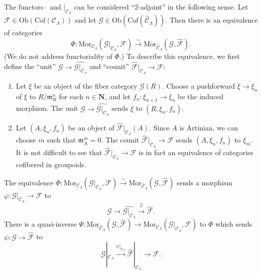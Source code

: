 \begin{remark}
\medskip \noindent
The functors $\widehat{~}$ and $|_{\mathcal{C}_\Lambda}$ can be considered 
``2-adjoint'' in the following sense.  Let $\mathcal{F} \in 
\text{Ob}(\text{Cof}(\mathcal{C}_\Lambda))$ and let $\mathcal G 
\in \text{Ob}(\text{Cof}(\widehat{\mathcal{C}}_\Lambda))$.  Then 
there is an equivalence of categories
\[ 
\Phi: \text{Mor}_{\mathcal{C}_\Lambda}(\mathcal G|_{\mathcal 
C_\Lambda}, \mathcal{F}) 
\xrightarrow{\sim} 
\text{Mor}_{\widehat{\mathcal{C}}_\Lambda}(\mathcal G, \widehat{\mathcal 
F}) .
\]
(We do not address functoriality of $\Phi$.) To describe this equivalence, we 
first define the ``unit'' $\mathcal G \to \widehat{\mathcal 
G|_{\mathcal{C}_\Lambda}}$ and ``counit'' $\widehat{\mathcal{F}}|_{\mathcal 
C_\Lambda} \to \mathcal{F}$:
\begin{enumerate}
\item Let $\xi$ be an object of the fiber category $\mathcal G(R)$.  Choose a 
pushforward $\xi \to \xi_{n}$ of $\xi$ to $R/\mathfrak{m}_{R}^{n}$ for 
each $n \in \mathbf{N}$, and let $f_{n}: \xi_{n+1} \to \xi_{n}$ be the 
induced morphism.  The unit $\mathcal G \to \widehat{\mathcal 
G|_{\mathcal{C}_\Lambda}}$ sends $\xi$ to $(R,\xi_{n},f_{n})$.  
\item Let $(A,\xi_n,f_n)$ be an object of $\widehat{\mathcal{F}}|_{\mathcal 
C_\Lambda}(A)$. Since $A$ is Artinian, we can choose $m$ such that 
$\mathfrak{m}_{A}^{m} = 0$.  The counit $\widehat{\mathcal{F}}|_{\mathcal 
C_\Lambda} \to \mathcal{F}$ sends $(A,\xi_n,f_n)$ to $\xi_{m}$.  It is 
not difficult to see that $\widehat{\mathcal{F}}|_{\mathcal{C}_\Lambda} 
\to \mathcal{F}$ is in fact an equivalence of categories cofibered in 
groupoids.
\end{enumerate}
The equivalence $\Phi: \text{Mor}_{\mathcal{C}_\Lambda}(\mathcal 
G|_{\mathcal{C}_\Lambda}, \mathcal{F}) 
\xrightarrow{\sim} 
\text{Mor}_{\widehat{\mathcal{C}}_\Lambda}(\mathcal G, \widehat{\mathcal 
F})$ sends a morphism $\varphi: \mathcal G|_{\mathcal{C}_\Lambda} \to 
\mathcal{F}$ to
\[ \mathcal G \to \widehat{\mathcal G|_{\mathcal{C}_\Lambda}} 
\xrightarrow{\widehat{\varphi}} \widehat{\mathcal{F}} .\]
There is a quasi-inverse $\Psi: \text{Mor}_{\widehat{\mathcal 
C}_\Lambda}(\mathcal G, \widehat{\mathcal{F}}) \to 
\text{Mor}_{\mathcal{C}_\Lambda}(\mathcal G|_{\mathcal{C}_\Lambda}, 
\mathcal{F})$ to $\Phi$ which sends $\psi: \mathcal G \to 
\widehat{\mathcal{F}}$ to
\[ \mathcal G|_{\mathcal{C}_\Lambda} \xrightarrow{\psi|_{\mathcal 
C_\Lambda}} \widehat{\mathcal{F}}|_{\mathcal{C}_\Lambda} \to \mathcal 
F.\]
\end{remark}

